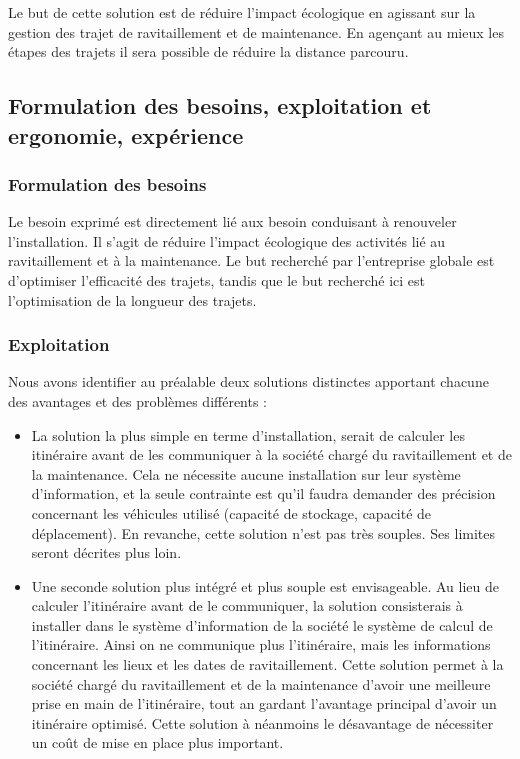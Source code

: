         Le but de cette solution est de réduire l'impact écologique en agissant sur la gestion des trajet de ravitaillement et de maintenance. En agençant au mieux les étapes des trajets il sera possible de réduire la distance parcouru.
        
    \subsection{Formulation des besoins, exploitation et ergonomie, expérience}
    
        \subsubsection{Formulation des besoins}
            
            Le besoin exprimé est directement lié aux besoin conduisant à renouveler l'installation. Il s'agit de réduire l'impact écologique des activités lié au ravitaillement et à la maintenance. Le but recherché par l'entreprise globale est d'optimiser l'efficacité des trajets, tandis que le but recherché ici est l'optimisation de la longueur des trajets.
            
        \subsubsection{Exploitation}
        
            Nous avons identifier au préalable deux solutions distinctes apportant chacune des avantages et des problèmes différents :
            \begin{itemize}
                \item La solution la plus simple en terme d'installation, serait de calculer les itinéraire avant de les communiquer à la société chargé du ravitaillement et de la maintenance. Cela ne nécessite aucune installation sur leur système d'information, et la seule contrainte est qu'il faudra demander des précision concernant les véhicules utilisé (capacité de stockage, capacité de déplacement).
                En revanche, cette solution n'est pas très souples. Ses limites seront décrites plus loin.

                \item Une seconde solution plus intégré et plus souple est envisageable. Au lieu de calculer l'itinéraire avant de le communiquer, la solution consisterais à installer dans le système d'information de la société le système de calcul de l'itinéraire.
                Ainsi on ne communique plus l'itinéraire, mais les informations concernant les lieux et les dates de ravitaillement.
                Cette solution permet à la société chargé du ravitaillement et de la maintenance d'avoir une meilleure prise en main de l'itinéraire, tout an gardant l'avantage principal d'avoir un itinéraire optimisé.
                Cette solution à néanmoins le désavantage de nécessiter un coût de mise en place plus important.
            \end{itemize}
        
